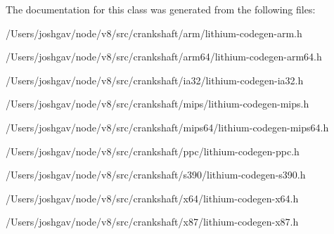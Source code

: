 The documentation for this class was generated from the following files\+:\begin{DoxyCompactItemize}
\item 
/\+Users/joshgav/node/v8/src/crankshaft/arm/lithium-\/codegen-\/arm.\+h\item 
/\+Users/joshgav/node/v8/src/crankshaft/arm64/lithium-\/codegen-\/arm64.\+h\item 
/\+Users/joshgav/node/v8/src/crankshaft/ia32/lithium-\/codegen-\/ia32.\+h\item 
/\+Users/joshgav/node/v8/src/crankshaft/mips/lithium-\/codegen-\/mips.\+h\item 
/\+Users/joshgav/node/v8/src/crankshaft/mips64/lithium-\/codegen-\/mips64.\+h\item 
/\+Users/joshgav/node/v8/src/crankshaft/ppc/lithium-\/codegen-\/ppc.\+h\item 
/\+Users/joshgav/node/v8/src/crankshaft/s390/lithium-\/codegen-\/s390.\+h\item 
/\+Users/joshgav/node/v8/src/crankshaft/x64/lithium-\/codegen-\/x64.\+h\item 
/\+Users/joshgav/node/v8/src/crankshaft/x87/lithium-\/codegen-\/x87.\+h\end{DoxyCompactItemize}
